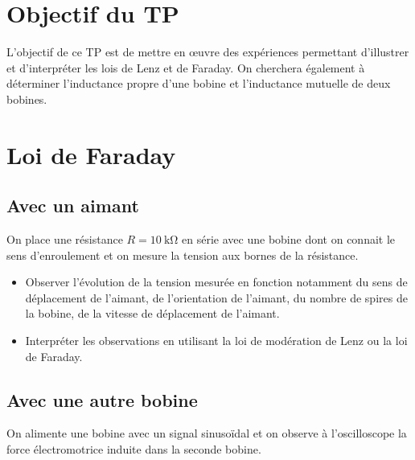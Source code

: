 \documentclass{tp}
\begin{document}

\section{Objectif du TP}
L'objectif de ce TP est de mettre en \oe{}uvre des expériences permettant d'illustrer et d'interpréter les lois de Lenz et de Faraday. On cherchera également à déterminer l'inductance propre d'une bobine et l'inductance mutuelle de deux bobines.

\section{Loi de Faraday}%
\label{sec:loi_de_faraday}
\subsection{Avec un aimant}%
\label{sub:avec_un_aimant}
On place une résistance $R=\SI{10}{\kilo\ohm}$ en série avec une bobine dont on connait le sens d'enroulement et on mesure la tension aux bornes de la résistance. 
\begin{center}
\end{center}
\begin{itemize}
  \item Observer l'évolution de la tension mesurée en fonction notamment du sens de déplacement de l'aimant, de l'orientation de l'aimant, du nombre de spires de la bobine, de la vitesse de déplacement de l'aimant.
  \item Interpréter les observations en utilisant la loi de modération de Lenz ou la loi de Faraday.
\end{itemize}

  \subsection{Avec une autre bobine}%
  \label{sub:avec_une_autre_bobine}
  
  On alimente une bobine avec un signal sinusoïdal et on observe à l'oscilloscope la force électromotrice induite dans la seconde bobine.
\end{document}
